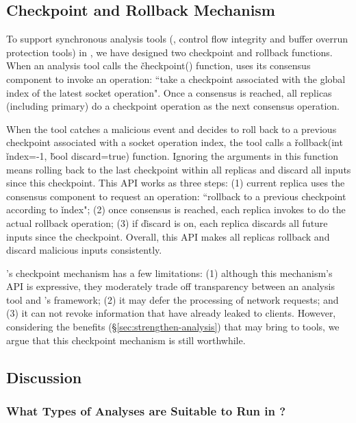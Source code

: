 \subsection{Checkpoint and Rollback Mechanism} \label{sec:checkpoint}

To support synchronous analysis tools (\eg, control flow integrity and buffer 
overrun protection tools) in \xxx, we have designed two checkpoint and rollback 
functions. When an analysis tool calls the \v{checkpoint()} function, \xxx uses 
its \paxos consensus component to invoke an operation: ``take a checkpoint 
associated with the global index of the latest socket operation". Once a 
consensus is reached, all replicas (including primary) do a checkpoint 
operation as the next consensus operation.


When the tool catches a malicious event and decides to roll back to a previous
checkpoint associated with a socket operation index, the tool calls a 
\v{rollback(int} \v{index=-1,} \v{bool discard=true)} function. Ignoring the 
arguments in this function means rolling back to the last checkpoint within all 
replicas and discard all inputs since this checkpoint. This API works as three 
steps: (1) current replica uses the \paxos consensus component to request an 
operation: ``rollback to a previous checkpoint according to \v{index}"; (2) 
once consensus is reached, each replica invokes \criu to do the actual rollback 
operation; (3) if \v{discard} is on, each replica discards all future inputs 
since the checkpoint. Overall, this API makes all replicas rollback and discard 
malicious inputs consistently.


\xxx's checkpoint mechanism has a few limitations: (1) although this mechanism's 
API is expressive, they moderately trade off transparency between an analysis 
tool and \xxx's framework; (2) it may defer the processing of network requests; 
and (3) it can not revoke information that have already leaked to clients. 
However, considering the benefits (\S\ref{sec:strengthen-analysis}) that \xxx 
may bring to tools, we argue that this checkpoint mechanism is still worthwhile.


\subsection{Discussion} \label{sec:discuss}

\subsubsection{What Types of Analyses are Suitable to Run in \xxx?} 
\label{sec:analysis-types}


